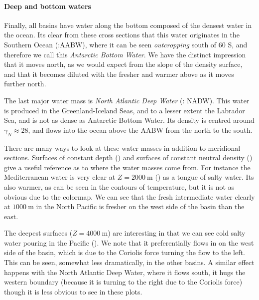 \paragraph{Deep and bottom waters} Finally, all basins have water along the bottom composed of the densest water in the ocean.  Its clear from these cross sections that this water originates in the Southern Ocean (:AABW), where it can be seen \emph{outcropping} south of 60 S, and therefore we call this \emph{Antarctic Bottom Water}.  We have the distinct impression that it moves north, as we would expect from the slope of the density surface, and that it becomes diluted with the fresher and warmer above as it moves further north.  

The last major water mass is \emph{North Atlantic Deep Water} (: NADW).  This water is produced in the Greenland-Iceland Seas, and to a lesser extent the Labrador Sea, and is not as dense as Antarctic Bottom Water.  Its density is centred around $\gamma_N \approx 28$, and flows into the ocean above the AABW from the north to the south.  

There are many ways to look at these water masses in addition to meridional sections.  Surfaces of constant depth () and surfaces of constant neutral density () give a useful reference as to where the water masses come from.  For instance the Mediterranean water is very clear at $Z=2000\ \mathrm{m}$ () as a tongue of salty water.  Its also warmer, as can be seen in the contours of temperature, but it is not as obvious due to the colormap.  We can see that the fresh intermediate water clearly at $1000\ \mathrm{m}$ in the North Pacific is fresher on the west side of the basin than the east.  

The deepest surfaces ($Z = 4000 \ \mathrm{m}$) are interesting in that we can see cold salty water pouring in the Pacific ().  We note that it preferentially flows in on the west side of the basin, which is due to the Coriolis force turning the flow to the left.  This can be seen, somewhat less dramatically, in the other basins.  A similar effect happens with the North Atlantic Deep Water, where it flows south, it hugs the western boundary (because it is turning to the right due to the Coriolis force) though it is less obvious to see in these plots.  

